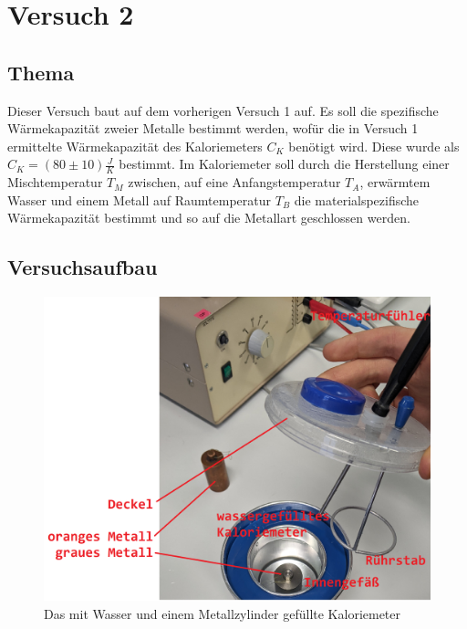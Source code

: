 \documentclass[
  9pt,
]{article}
\begin{document}
\hypertarget{versuch-2}{%
\section{Versuch 2}\label{versuch-2}}

\hypertarget{thema-1}{%
\subsection{Thema}\label{thema-1}}

Dieser Versuch baut auf dem vorherigen Versuch 1 auf. Es soll die
spezifische Wärmekapazität zweier Metalle bestimmt werden, wofür die in
Versuch 1 ermittelte Wärmekapazität des Kaloriemeters \(C_K\) benötigt
wird. Diese wurde als \(C_K=(80 \pm 10)\frac{J}{K}\) bestimmt. Im
Kaloriemeter soll durch die Herstellung einer Mischtemperatur \(T_M\)
zwischen, auf eine Anfangstemperatur \(T_A\), erwärmtem Wasser und einem
Metall auf Raumtemperatur \(T_B\) die materialspezifische Wärmekapazität
bestimmt und so auf die Metallart geschlossen werden.

\hypertarget{versuchsaufbau}{%
\subsection{Versuchsaufbau}\label{versuchsaufbau}}

\begin{figure}
\centering
\includegraphics[width=\textwidth,height=0.25\textheight]{Bilder/V2.png}
\caption{Das mit Wasser und einem Metallzylinder gefüllte Kaloriemeter}
\end{figure}
\end{document}
